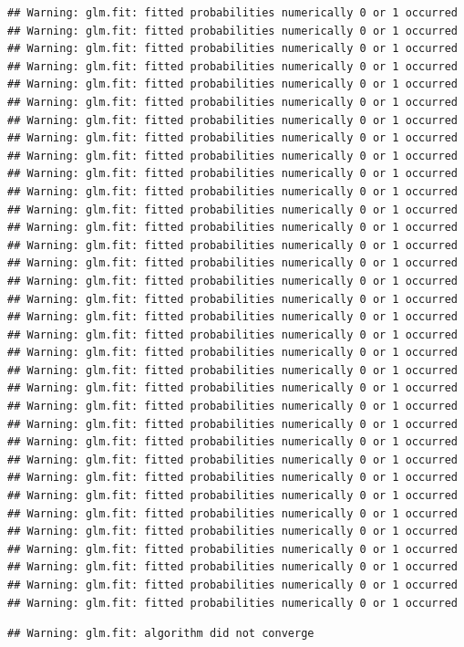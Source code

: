\documentclass[
]{article}
\begin{document}
\begin{verbatim}
## Warning: glm.fit: fitted probabilities numerically 0 or 1 occurred
## Warning: glm.fit: fitted probabilities numerically 0 or 1 occurred
## Warning: glm.fit: fitted probabilities numerically 0 or 1 occurred
## Warning: glm.fit: fitted probabilities numerically 0 or 1 occurred
## Warning: glm.fit: fitted probabilities numerically 0 or 1 occurred
## Warning: glm.fit: fitted probabilities numerically 0 or 1 occurred
## Warning: glm.fit: fitted probabilities numerically 0 or 1 occurred
## Warning: glm.fit: fitted probabilities numerically 0 or 1 occurred
## Warning: glm.fit: fitted probabilities numerically 0 or 1 occurred
## Warning: glm.fit: fitted probabilities numerically 0 or 1 occurred
## Warning: glm.fit: fitted probabilities numerically 0 or 1 occurred
## Warning: glm.fit: fitted probabilities numerically 0 or 1 occurred
## Warning: glm.fit: fitted probabilities numerically 0 or 1 occurred
## Warning: glm.fit: fitted probabilities numerically 0 or 1 occurred
## Warning: glm.fit: fitted probabilities numerically 0 or 1 occurred
## Warning: glm.fit: fitted probabilities numerically 0 or 1 occurred
## Warning: glm.fit: fitted probabilities numerically 0 or 1 occurred
## Warning: glm.fit: fitted probabilities numerically 0 or 1 occurred
## Warning: glm.fit: fitted probabilities numerically 0 or 1 occurred
## Warning: glm.fit: fitted probabilities numerically 0 or 1 occurred
## Warning: glm.fit: fitted probabilities numerically 0 or 1 occurred
## Warning: glm.fit: fitted probabilities numerically 0 or 1 occurred
## Warning: glm.fit: fitted probabilities numerically 0 or 1 occurred
## Warning: glm.fit: fitted probabilities numerically 0 or 1 occurred
## Warning: glm.fit: fitted probabilities numerically 0 or 1 occurred
## Warning: glm.fit: fitted probabilities numerically 0 or 1 occurred
## Warning: glm.fit: fitted probabilities numerically 0 or 1 occurred
## Warning: glm.fit: fitted probabilities numerically 0 or 1 occurred
## Warning: glm.fit: fitted probabilities numerically 0 or 1 occurred
## Warning: glm.fit: fitted probabilities numerically 0 or 1 occurred
## Warning: glm.fit: fitted probabilities numerically 0 or 1 occurred
## Warning: glm.fit: fitted probabilities numerically 0 or 1 occurred
## Warning: glm.fit: fitted probabilities numerically 0 or 1 occurred
## Warning: glm.fit: fitted probabilities numerically 0 or 1 occurred
\end{verbatim}

\begin{verbatim}
## Warning: glm.fit: algorithm did not converge
\end{verbatim}
\end{document}
